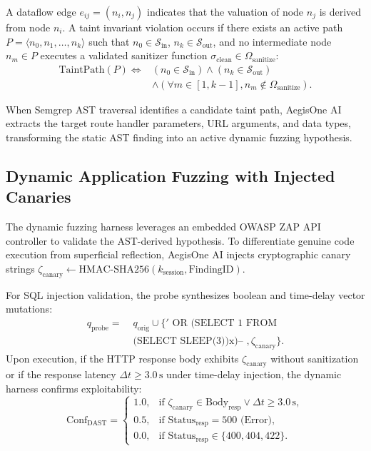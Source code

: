 \documentclass[journal,twoside]{IEEEtran}
\begin{document}
A dataflow edge $e_{ij} = (n_i, n_j)$ indicates that the valuation of node $n_j$ is derived from node $n_i$. A taint invariant violation occurs if there exists an active path $P = \langle n_0, n_1, \dots, n_k \rangle$ such that $n_0 \in \mathcal{S}_{\text{in}}$, $n_k \in \mathcal{S}_{\text{out}}$, and no intermediate node $n_m \in P$ executes a validated sanitizer function $\sigma_{\text{clean}} \in \Omega_{\text{sanitize}}$:
\begin{equation}
\begin{aligned}
\text{TaintPath}(P) \iff & (n_0 \in \mathcal{S}_{\text{in}}) \wedge (n_k \in \mathcal{S}_{\text{out}}) \\
& \wedge (\forall m \in [1, k-1], n_m \notin \Omega_{\text{sanitize}}).
\end{aligned}
\end{equation}

When Semgrep AST traversal identifies a candidate taint path, AegisOne AI extracts the target route handler parameters, URL arguments, and data types, transforming the static AST finding into an active dynamic fuzzing hypothesis.

\subsection{Dynamic Application Fuzzing with Injected Canaries}
The dynamic fuzzing harness leverages an embedded OWASP ZAP API controller to validate the AST-derived hypothesis. To differentiate genuine code execution from superficial reflection, AegisOne AI injects cryptographic canary strings $\zeta_{\text{canary}} \leftarrow \text{HMAC-SHA256}(k_{\text{session}}, \text{FindingID})$.

For SQL injection validation, the probe synthesizes boolean and time-delay vector mutations:
\begin{equation}
\begin{aligned}
q_{\text{probe}} = \; & q_{\text{orig}} \cup \{'\text{ OR (SELECT 1 FROM } \\
& \text{(SELECT SLEEP(3))x)-- }, \zeta_{\text{canary}}\}.
\end{aligned}
\end{equation}
Upon execution, if the HTTP response body exhibits $\zeta_{\text{canary}}$ without sanitization or if the response latency $\Delta t \ge 3.0\,\text{s}$ under time-delay injection, the dynamic harness confirms exploitability:
\begin{equation}
\text{Conf}_{\text{DAST}} = 
\begin{cases}
1.0, & \text{if } \zeta_{\text{canary}} \in \text{Body}_{\text{resp}} \vee \Delta t \ge 3.0\,\text{s}, \\
0.5, & \text{if } \text{Status}_{\text{resp}} = 500 \text{ (Error)}, \\
0.0, & \text{if } \text{Status}_{\text{resp}} \in \{400, 404, 422\}.
\end{cases}
\end{equation}
\end{document}
